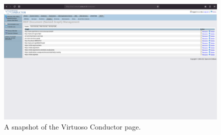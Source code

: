 \begin{figure}[!ht]
  \centering
  \includegraphics[width=\columnwidth]{images/virtuoso/virtuoso-graph}
  \caption{A snapshot of the Virtuoso Conductor page.}
  \label{fig:virtuoso-graph}
\end{figure}